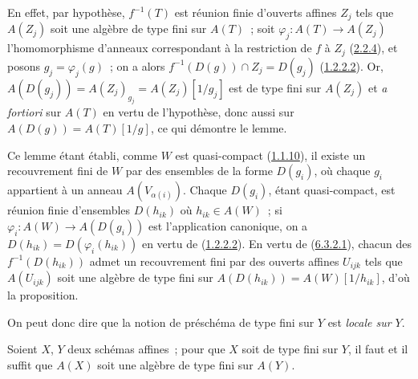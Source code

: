 En effet, par hypothèse, $f^{-1}(T)$ est réunion finie d'ouverts affines
$Z_j$ tels que $A(Z_j)$ soit une algèbre de type fini sur $A(T)$~; soit
$\varphi_j:A(T)\to A(Z_j)$ l'homomorphisme d'anneaux correspondant à la
restriction de $f$ à $Z_j$ (\hyperref[I.2.2.4-fr]{2.2.4}), et posons
$g_j=\varphi_j(g)$~; on a alors
$f^{-1}(D(g))\cap Z_j=D(g_j)$
(\hyperref[I.1.2.2.2-fr]{1.2.2.2}). Or,
$A(D(g_j))=A(Z_j)_{g_j}=A(Z_j)[1/g_j]$ est de type fini sur $A(Z_j)$ et
\emph{a fortiori} sur $A(T)$ en vertu de l'hypothèse, donc aussi sur
$A(D(g))=A(T)[1/g]$, ce qui démontre le lemme.

Ce lemme étant établi, comme $W$ est quasi-compact
(\hyperref[I.1.1.10-fr]{1.1.10}), il existe un recouvrement fini de $W$ par
des ensembles de la forme $D(g_i)$, où chaque $g_i$ appartient à un anneau
$A(V_{\alpha(i)})$. Chaque $D(g_i)$, étant quasi-compact, est réunion finie
d'ensembles $D(h_{ik})$ où $h_{ik}\in A(W)$~; si
$\varphi_i:A(W)\to A(D(g_i))$ est l'application canonique, on a
$D(h_{ik})=D(\varphi_i(h_{ik}))$ en vertu de
(\hyperref[I.1.2.2.2-fr]{1.2.2.2}). En vertu de
(\hyperref[I.6.3.2.1-fr]{6.3.2.1}), chacun des
$f^{-1}(D(h_{ik}))$ admet un recouvrement fini par des ouverts affines
$U_{ijk}$ tels que $A(U_{ijk})$ soit une algèbre de type fini sur
$A(D(h_{ik}))=A(W)[1/h_{ik}]$, d'où la proposition.

On peut donc dire que la notion de préschéma de type fini sur $Y$ est
\emph{locale sur $Y$}.

\begin{proposition}[6.3.3]
\label{I.6.3.3-fr}
Soient $X$, $Y$ deux schémas affines~; pour que $X$ soit de type fini sur
$Y$, il faut et il suffit que $A(X)$ soit une algèbre de type fini sur
$A(Y)$.
\end{proposition}

